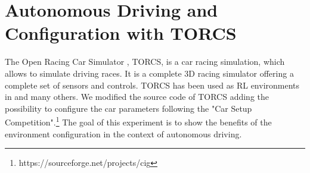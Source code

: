 

%
%

\clearpage

\section{Autonomous Driving and Configuration with TORCS}\label{sec:torcs}
The Open Racing Car Simulator \citep{TORCS}, TORCS, is a car racing simulation, which allows to simulate driving races. It is a complete 3D racing simulator offering a complete set of sensors and controls. TORCS has been used as RL environments in \citep{torcs-1, torcs-2, torcs-3, torcs-4} and many others. \newline
We modified the source code of TORCS adding the possibility to configure the car parameters following the "Car Setup Competition".\footnote{https://sourceforge.net/projects/cig} 
The goal of this experiment is to show the benefits of the environment configuration in the context of autonomous driving. 
